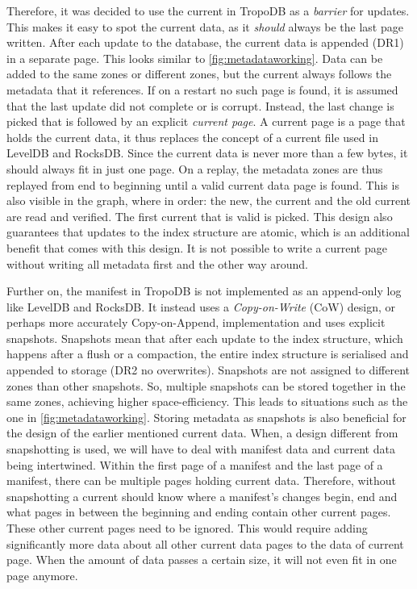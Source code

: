 Therefore, it was decided to use the current in TropoDB as a \textit{barrier} for updates. This makes it easy to spot the current data, as it \textit{should} always be the last page written. After each update to the database, the current data is appended (DR1) in a separate page. This looks similar to \autoref{fig:metadataworking}. Data can be added to the same zones or different zones, but the current always follows the metadata that it references. If on a restart no such page is found, it is assumed that the last update did not complete or is corrupt. Instead, the last change is picked that is followed by an explicit \textit{current page}. A current page is a page that holds the current data, it thus replaces the concept of a current file used in LevelDB and RocksDB. Since the current data is never more than a few bytes, it should always fit in just one page. On a replay, the metadata zones are thus replayed from end to beginning until a valid current data page is found. This is also visible in the graph, where in order: the new, the current and the old current are read and verified. The first current that is valid is picked. This design also guarantees that updates to the index structure are atomic, which is an additional benefit that comes with this design. It is not possible to write a current page without writing all metadata first and the other way around.

Further on, the manifest in TropoDB is not implemented as an append-only log like LevelDB and RocksDB. It instead uses a \textit{Copy-on-Write} (CoW) design, or perhaps more accurately Copy-on-Append, implementation and uses explicit snapshots. Snapshots mean that after each update to the index structure, which happens after a flush or a compaction, the entire index structure is serialised and appended to storage (DR2 no overwrites). Snapshots are not assigned to different zones than other snapshots. So, multiple snapshots can be stored together in the same zones, achieving higher space-efficiency. This leads to situations such as the one in \autoref{fig:metadataworking}. Storing metadata as snapshots is also beneficial for the design of the earlier mentioned current data. When, a design different from snapshotting is used, we will have to deal with manifest data and current data being intertwined. Within the first page of a manifest and the last page of a manifest, there can be multiple pages holding current data. Therefore, without snapshotting a current should know where a manifest's changes begin, end and what pages in between the beginning and ending contain other current pages. These other current pages need to be ignored. This would require adding significantly more data about all other current data pages to the data of current page. When the amount of data passes a certain size, it will not even fit in one page anymore.

